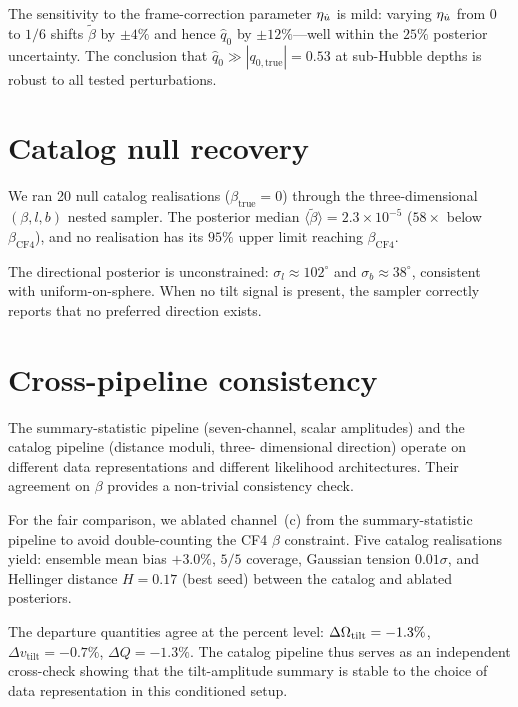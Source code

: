 The sensitivity to the frame-correction parameter $\eta_{\dot{u}}$ is
mild: varying $\eta_{\dot{u}}$ from $0$ to $1/6$ shifts
$\tilde{\beta}$ by $\pm 4\%$ and hence $\hat{q}_0$ by $\pm
12\%$---well within the $25\%$ posterior uncertainty.  The
conclusion that $\hat{q}_0 \gg |q_{0,\mathrm{true}}| = 0.53$ at
sub-Hubble depths is robust to all tested perturbations.


\section{Catalog null recovery}\label{sec:null-cat}

We ran 20 null catalog realisations ($\beta_{\mathrm{true}} = 0$)
through the three-dimensional $({\beta}, l, b)$ nested
sampler.  The posterior median
$\langle\tilde{\beta}\rangle = 2.3 \times 10^{-5}$
($58\times$ below $\beta_{\mathrm{CF4}}$), and no realisation
has its $95\%$ upper limit reaching $\beta_{\mathrm{CF4}}$.

The directional posterior is unconstrained:
$\sigma_l \approx 102^\circ$ and $\sigma_b \approx 38^\circ$,
consistent with uniform-on-sphere.  When no tilt signal is
present, the sampler correctly reports that no preferred
direction exists.


\section{Cross-pipeline consistency}\label{sec:cross-robust}

The summary-statistic pipeline (seven-channel, scalar
amplitudes) and the catalog pipeline (distance moduli, three-
dimensional direction) operate on different data
representations and different likelihood architectures.  Their
agreement on $\beta$ provides a non-trivial consistency check.

For the fair comparison, we ablated channel~(c) from the
summary-statistic pipeline to avoid double-counting the CF4
$\beta$ constraint.  Five catalog realisations yield: ensemble
mean bias $+3.0\%$, $5/5$ coverage, Gaussian tension
$0.01\sigma$, and Hellinger distance $H = 0.17$ (best seed)
between the catalog and ablated posteriors.

The departure quantities agree at the percent level:
$\Delta\Omega_{\mathrm{tilt}} = -1.3\%$,
$\Delta v_{\mathrm{tilt}} = -0.7\%$,
$\Delta Q = -1.3\%$.
The catalog pipeline thus serves as an independent cross-check
showing that the tilt-amplitude summary is stable to the choice of
data representation in this conditioned setup.


